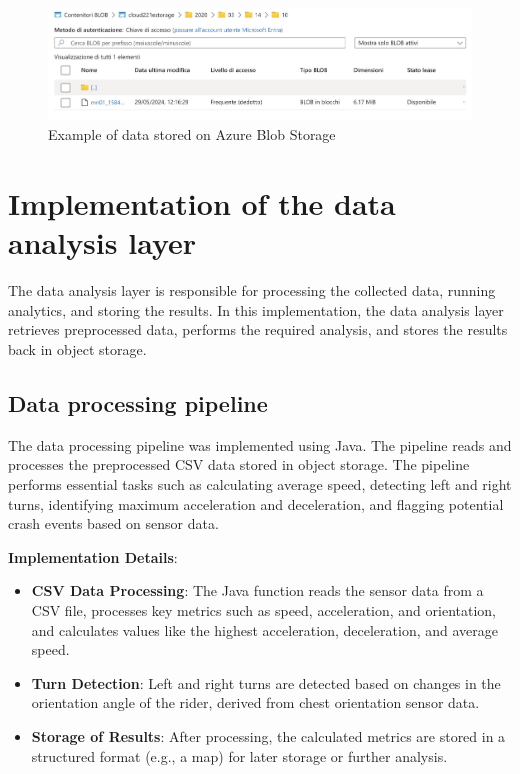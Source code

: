 \begin{figure}[htbp]
    \centering
    \includegraphics[width=1\textwidth]{Immagini/azure_storage.png}
    \caption{Example of data stored on Azure Blob Storage}
    \label{fig:azure_obj_storage}
\end{figure}


\section{Implementation of the data analysis layer}
\label{sec:implementation_data_analysis}

The data analysis layer is responsible for processing the collected data, running analytics, and storing the results. In this implementation, the data analysis layer retrieves preprocessed data, performs the required analysis, and stores the results back in object storage.

\subsection{Data processing pipeline}
\label{sec:data_processing_pipeline}

The data processing pipeline was implemented using Java. The pipeline reads and processes the preprocessed CSV data stored in object storage. The pipeline performs essential tasks such as calculating average speed, detecting left and right turns, identifying maximum acceleration and deceleration, and flagging potential crash events based on sensor data.

\textbf{Implementation Details}:
\begin{itemize}
    \item \textbf{CSV Data Processing}: The Java function reads the sensor data from a CSV file, processes key metrics such as speed, acceleration, and orientation, and calculates values like the highest acceleration, deceleration, and average speed.
    \item \textbf{Turn Detection}: Left and right turns are detected based on changes in the orientation angle of the rider, derived from chest orientation sensor data. 
    \item \textbf{Storage of Results}: After processing, the calculated metrics are stored in a structured format (e.g., a map) for later storage or further analysis.
\end{itemize}

